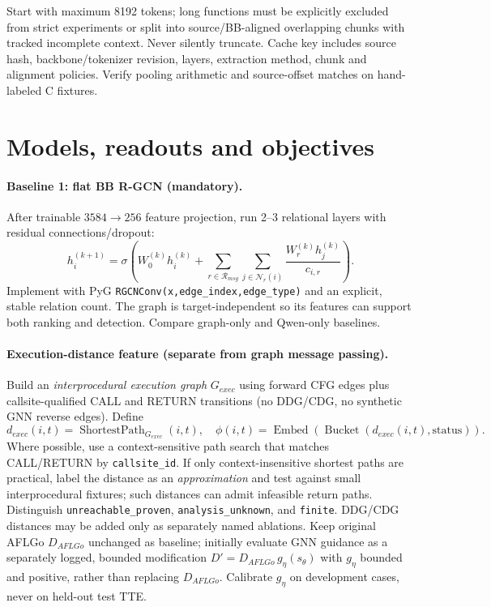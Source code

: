 \documentclass[10pt,a4paper]{article}
\begin{document}
Start with maximum 8192 tokens; long functions must be explicitly excluded from strict experiments or split into source/BB-aligned overlapping chunks with tracked incomplete context. Never silently truncate. Cache key includes source hash, backbone/tokenizer revision, layers, extraction method, chunk and alignment policies. Verify pooling arithmetic and source-offset matches on hand-labeled C fixtures.

\section{Models, readouts and objectives}
\paragraph{Baseline 1: flat BB R-GCN (mandatory).}
After trainable $3584\to256$ feature projection, run 2--3 relational layers with residual connections/dropout:
\[
 h_i^{(k+1)}=\sigma\!\left(W_0^{(k)}h_i^{(k)}+
 \sum_{r\in\mathcal R_{msg}}\sum_{j\in\mathcal N_r(i)}
 \frac{W_r^{(k)}h_j^{(k)}}{c_{i,r}}\right).
\]
Implement with PyG \texttt{RGCNConv(x,edge\_index,edge\_type)} and an explicit, stable relation count. The graph is target-independent so its features can support both ranking and detection. Compare graph-only and Qwen-only baselines.

\paragraph{Execution-distance feature (separate from graph message passing).}
Build an \emph{interprocedural execution graph} $G_{exec}$ using forward CFG edges plus callsite-qualified CALL and RETURN transitions (no DDG/CDG, no synthetic GNN reverse edges). Define
\[
 d_{exec}(i,t)=\operatorname{ShortestPath}_{G_{exec}}(i,t),\quad
 \phi(i,t)=\operatorname{Embed}(\operatorname{Bucket}(d_{exec}(i,t),\mathrm{status})).
\]
Where possible, use a context-sensitive path search that matches CALL/RETURN by \texttt{callsite\_id}. If only context-insensitive shortest paths are practical, label the distance as an \emph{approximation} and test against small interprocedural fixtures; such distances can admit infeasible return paths. Distinguish \texttt{unreachable\_proven}, \texttt{analysis\_unknown}, and \texttt{finite}. DDG/CDG distances may be added only as separately named ablations. Keep original AFLGo $D_{AFLGo}$ unchanged as baseline; initially evaluate GNN guidance as a separately logged, bounded modification $D'=D_{AFLGo}\,g_\eta(s_\theta)$ with $g_\eta$ bounded and positive, rather than replacing $D_{AFLGo}$. Calibrate $g_\eta$ on development cases, never on held-out test TTE.
\end{document}
